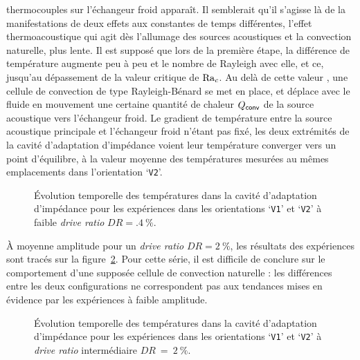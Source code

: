 thermocouples sur l'échangeur froid apparaît. Il semblerait qu'il s'agisse là de la manifestations de deux effets aux constantes de temps différentes, l'effet thermoacoustique qui agit dès l'allumage des sources acoustiques et la convection naturelle, plus lente. Il est supposé que lors de la première étape, la différence de température augmente peu à peu et le nombre de Rayleigh avec elle, et ce, jusqu'au dépassement de la valeur critique de $\mathrm{Ra}_c$. Au delà de cette valeur , une cellule de convection de type Rayleigh-Bénard se met en place, et déplace avec le fluide en mouvement une certaine quantité de chaleur $Q_{\sf conv}$ de la source acoustique vers l'échangeur froid. Le gradient de température entre la source acoustique principale et l'échangeur froid n'étant pas fixé, les deux extrémités de la cavité d'adaptation d'impédance voient leur température converger vers un point d'équilibre, à la valeur moyenne des températures mesurées au mêmes emplacements dans l'orientation `\texttt{V2}'.
\smallskip
 
\begin{figure}[!ht]
    \centering
    
    \caption{\'Evolution temporelle des températures dans la cavité d'adaptation d'impédance pour les expériences dans les orientations `\texttt{V1}' et `\texttt{V2}' à faible \textit{drive ratio} $DR=\qty{.4}{\percent}$.}
    \label{fig:Acou_CHXout_V1V2_Low}
\end{figure}

À moyenne amplitude pour un \textit{drive ratio} $DR=\qty{2}{\percent}$, les résultats des expériences sont tracés sur la figure~\ref{fig:Acou_CHXout_V1V2_Mid}. Pour cette série, il est difficile de conclure sur le comportement d'une supposée cellule de convection naturelle : les différences entre les deux configurations ne correspondent pas aux tendances mises en évidence par les expériences à faible amplitude.
\smallskip

\begin{figure}[!ht]
    \centering
    
    \caption{\'Evolution temporelle des températures dans la cavité d'adaptation d'impédance pour les expériences dans les orientations `\texttt{V1}' et `\texttt{V2}' à \textit{drive ratio} intermédiaire $DR~=~\qty{2}{\percent}$.}
    \label{fig:Acou_CHXout_V1V2_Mid}
\end{figure}

